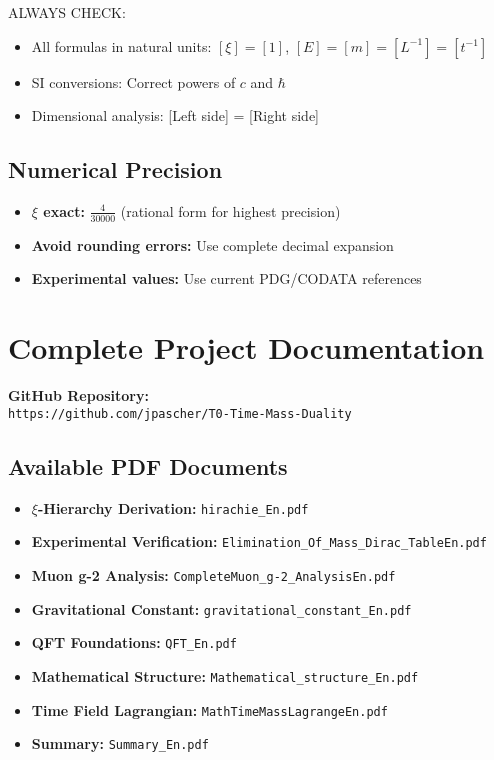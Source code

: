 \documentclass[12pt,a4paper]{article}
\begin{document}
	ALWAYS CHECK:
	\begin{itemize}
		\item All formulas in natural units: \([\xi] = [1]\), \([E] = [m] = [L^{-1}] = [t^{-1}]\)
		\item SI conversions: Correct powers of \(c\) and \(\hbar\)
		\item Dimensional analysis: [Left side] = [Right side]
	\end{itemize}
	
	\subsection{Numerical Precision}
	
	\begin{itemize}
		\item \textbf{\(\xi\) exact:} \(\frac{4}{30000}\) (rational form for highest precision)
		\item \textbf{Avoid rounding errors:} Use complete decimal expansion
		\item \textbf{Experimental values:} Use current PDG/CODATA references
	\end{itemize}
	
	\section{Complete Project Documentation}
	
	\textbf{GitHub Repository:}\\
	\texttt{https://github.com/jpascher/T0-Time-Mass-Duality}
	\subsection{Available PDF Documents}
	
	\begin{itemize}
		\item \textbf{\(\xi\)-Hierarchy Derivation:} \texttt{hirachie\_En.pdf}
		\item \textbf{Experimental Verification:} \texttt{Elimination\_Of\_Mass\_Dirac\_TableEn.pdf}
		\item \textbf{Muon g-2 Analysis:} \texttt{CompleteMuon\_g-2\_AnalysisEn.pdf}
		\item \textbf{Gravitational Constant:} \texttt{gravitational\_constant\_En.pdf}
		\item \textbf{QFT Foundations:} \texttt{QFT\_En.pdf}
		\item \textbf{Mathematical Structure:} \texttt{Mathematical\_structure\_En.pdf}
		\item \textbf{Time Field Lagrangian:} \texttt{MathTimeMassLagrangeEn.pdf}
		\item \textbf{Summary:} \texttt{Summary\_En.pdf}
	\end{itemize}
	
\end{document}
